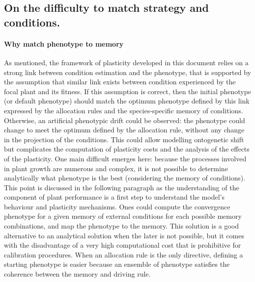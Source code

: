 

\subsection{On the difficulty to match strategy and conditions.}\label{subsection:match}

\paragraph{Why match phenotype to memory}

As mentioned, the framework of plasticity developed in this document relies on a strong link between condition estimation and the phenotype, that is supported by the assumption that similar link exists between condition experienced by the focal plant and its fitness. If this assumption is correct, then the initial phenotype (or default phenotype) should match the optimum phenotype defined by this link expressed by the allocation rules and the species-specific memory of conditions. Otherwise, an artificial phenotypic drift could be observed: the phenotype could change to meet the optimum defined by the allocation rule, without any change in the projection of the conditions. This could allow modelling ontogenetic shift but complicates the computation of plasticity costs and the analysis of the effects of the plasticity. One main difficult emerges here: because the processes involved in plant growth are numerous and complex, it is not possible to determine analytically what phenotype is the best (considering the memory of conditions). This point is discussed in the following paragraph as the understanding of the component of plant performance is a first step to understand the model's behaviour and plasticity mechanisms. Ones could compute the convergence phenotype for a given memory of external conditions for each possible memory combinations, and map the phenotype to the memory.
This solution is a good alternative to an analytical solution when the later is not possible, but it comes with the disadvantage of a very high computational cost that is prohibitive for calibration procedures.
When an allocation rule is the only directive, defining a starting phenotype is easier because an ensemble of phenotype satisfies the coherence between the memory and driving rule.

